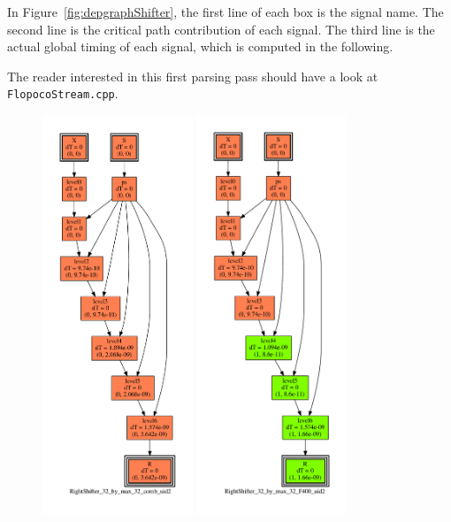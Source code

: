 \documentclass{article}
\begin{document}
  In Figure~\ref{fig:depgraphShifter}, the first line of each box is the signal name.
The second line is the critical path contribution of each signal.
  The third line is the actual global timing of each signal, which is computed in the following. 
  
The reader interested in this first parsing pass should have a look at \texttt{FlopocoStream.cpp}.

  \begin{figure}
    \includegraphics[width=0.4\textwidth]{Fig/depgraphShifterNoPipe}
    \hfill
    \includegraphics[width=0.4\textwidth]{Fig/depgraphShifterPipelined}

\end{figure}
\end{document}
